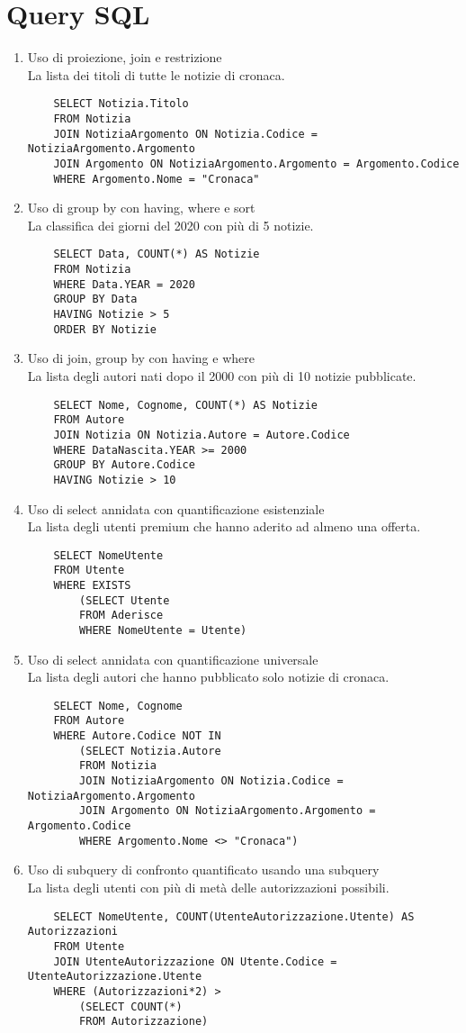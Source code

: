 \documentclass[10pt]{article}
\begin{document}
\section{Query SQL}
\begin{enumerate}
	\item Uso di proiezione, join e restrizione\\
	La lista dei titoli di tutte le notizie di cronaca.
	\begin{lstlisting}
	SELECT Notizia.Titolo
	FROM Notizia
	JOIN NotiziaArgomento ON Notizia.Codice = NotiziaArgomento.Argomento
	JOIN Argomento ON NotiziaArgomento.Argomento = Argomento.Codice
	WHERE Argomento.Nome = "Cronaca"
	\end{lstlisting}
	\item Uso di group by con having, where e sort\\
	La classifica dei giorni del 2020 con più di 5 notizie.
	\begin{lstlisting}
	SELECT Data, COUNT(*) AS Notizie
	FROM Notizia
	WHERE Data.YEAR = 2020
	GROUP BY Data
	HAVING Notizie > 5
	ORDER BY Notizie
	\end{lstlisting}
	\item Uso di join, group by con having e where\\
	La lista degli autori nati dopo il 2000 con più di 10 notizie pubblicate.
	\begin{lstlisting}
	SELECT Nome, Cognome, COUNT(*) AS Notizie
	FROM Autore
	JOIN Notizia ON Notizia.Autore = Autore.Codice
	WHERE DataNascita.YEAR >= 2000
	GROUP BY Autore.Codice
	HAVING Notizie > 10
	\end{lstlisting}
	\item Uso di select annidata con quantificazione esistenziale\\
	La lista degli utenti premium che hanno aderito ad almeno una offerta.
	\begin{lstlisting}
	SELECT NomeUtente
	FROM Utente
	WHERE EXISTS
		(SELECT Utente
		FROM Aderisce
		WHERE NomeUtente = Utente)
	\end{lstlisting}
	\item Uso di select annidata con quantificazione universale\\
	La lista degli autori che hanno pubblicato solo notizie di cronaca.
	\begin{lstlisting}
	SELECT Nome, Cognome
	FROM Autore
	WHERE Autore.Codice NOT IN
		(SELECT Notizia.Autore
		FROM Notizia
		JOIN NotiziaArgomento ON Notizia.Codice = NotiziaArgomento.Argomento
		JOIN Argomento ON NotiziaArgomento.Argomento = Argomento.Codice
		WHERE Argomento.Nome <> "Cronaca")
	\end{lstlisting}
	\item Uso di subquery di confronto quantificato usando una subquery\\
	La lista degli utenti con più di metà delle autorizzazioni possibili.
	\begin{lstlisting}
	SELECT NomeUtente, COUNT(UtenteAutorizzazione.Utente) AS Autorizzazioni
	FROM Utente
	JOIN UtenteAutorizzazione ON Utente.Codice = UtenteAutorizzazione.Utente
	WHERE (Autorizzazioni*2) > 
		(SELECT COUNT(*)
		FROM Autorizzazione)
	\end{lstlisting}
\end{enumerate}
\pagebreak
\end{document}
